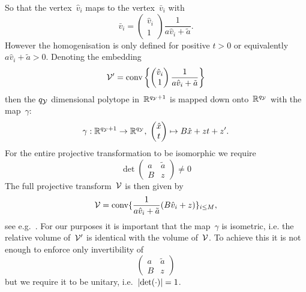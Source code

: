 %
So that the vertex~$\hat v_i$ maps to the vertex~$\bar v_i$ with
%
\begin{equation}
	\bar v_i = \begin{pmatrix}\hat v_i \\ 1\end{pmatrix}\frac{1}{a\hat v_i + \tilde a}.
\end{equation}
%
However the homogenisation is only defined for positive $t>0$ or equivalently~$a\hat v_i + \tilde a>0$.
%
Denoting the embedding
%
\begin{equation}
	\mathcal V^\prime = \text{conv}\left\{\begin{pmatrix}\hat v_i \\ 1\end{pmatrix}\frac{1}{a\hat v_i + \tilde a}\right\}
\end{equation}
%
then the $q_\mathcal Y$ dimensional polytope in~$\mathbb R^{q_\mathcal Y+1}$ is mapped down onto~$\mathbb R^{q_\mathcal Y}$ with the map~$\gamma$:
%
\begin{equation}
	\gamma : \mathbb R^{q_\mathcal Y+1} \rightarrow \mathbb R^{q_\mathcal Y},\; \begin{pmatrix}\hat x\\ t\end{pmatrix} \mapsto B\hat x + z t + z^\prime.
\end{equation}
%
For the entire projective transformation to be isomorphic we require
%
\begin{equation}
	\det\begin{pmatrix}a & \tilde a \\ B & z\end{pmatrix} \neq0
\end{equation}
%
The full projective transform~$\mathcal V$ is then given by
%
\begin{equation}
	\mathcal V = \text{conv}\{\frac{1}{a\hat v_i+\tilde a}(B\hat v_i+z)\}_{i\leq M},
\end{equation}
%
see e.g.~\cite{Ziegler:1995}.
%
For our purposes it is important that the map~$\gamma$ is isometric, i.e. the relative volume of~$\mathcal V^\prime$ is identical with the volume of~$\mathcal V$.
%
To achieve this it is not enough to enforce only invertibility of 
%
$$
\begin{pmatrix}a & \tilde a \\ B & z\end{pmatrix}
$$
%
but we require it to be unitary, i.e.~$\left|\det(\cdot)\right|=1$.
%

